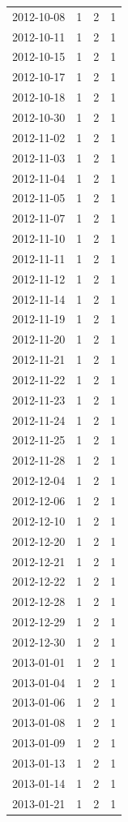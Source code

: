 \begin{tabular}{lrrr}
2012-10-08 & 1 & 2 & 1 \\
2012-10-11 & 1 & 2 & 1 \\
2012-10-15 & 1 & 2 & 1 \\
2012-10-17 & 1 & 2 & 1 \\
2012-10-18 & 1 & 2 & 1 \\
2012-10-30 & 1 & 2 & 1 \\
2012-11-02 & 1 & 2 & 1 \\
2012-11-03 & 1 & 2 & 1 \\
2012-11-04 & 1 & 2 & 1 \\
2012-11-05 & 1 & 2 & 1 \\
2012-11-07 & 1 & 2 & 1 \\
2012-11-10 & 1 & 2 & 1 \\
2012-11-11 & 1 & 2 & 1 \\
2012-11-12 & 1 & 2 & 1 \\
2012-11-14 & 1 & 2 & 1 \\
2012-11-19 & 1 & 2 & 1 \\
2012-11-20 & 1 & 2 & 1 \\
2012-11-21 & 1 & 2 & 1 \\
2012-11-22 & 1 & 2 & 1 \\
2012-11-23 & 1 & 2 & 1 \\
2012-11-24 & 1 & 2 & 1 \\
2012-11-25 & 1 & 2 & 1 \\
2012-11-28 & 1 & 2 & 1 \\
2012-12-04 & 1 & 2 & 1 \\
2012-12-06 & 1 & 2 & 1 \\
2012-12-10 & 1 & 2 & 1 \\
2012-12-20 & 1 & 2 & 1 \\
2012-12-21 & 1 & 2 & 1 \\
2012-12-22 & 1 & 2 & 1 \\
2012-12-28 & 1 & 2 & 1 \\
2012-12-29 & 1 & 2 & 1 \\
2012-12-30 & 1 & 2 & 1 \\
2013-01-01 & 1 & 2 & 1 \\
2013-01-04 & 1 & 2 & 1 \\
2013-01-06 & 1 & 2 & 1 \\
2013-01-08 & 1 & 2 & 1 \\
2013-01-09 & 1 & 2 & 1 \\
2013-01-13 & 1 & 2 & 1 \\
2013-01-14 & 1 & 2 & 1 \\
2013-01-21 & 1 & 2 & 1 \\

\end{tabular}
